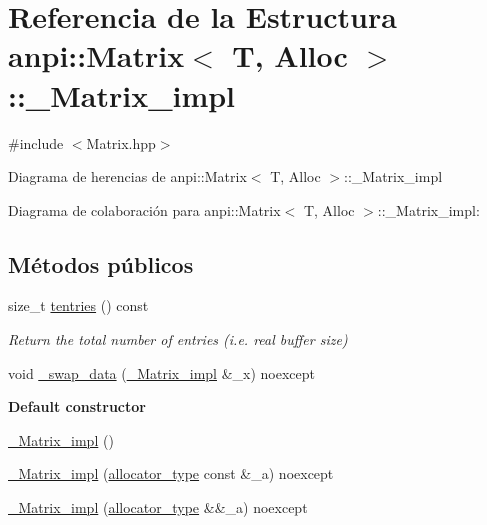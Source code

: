 \hypertarget{structanpi_1_1Matrix_1_1__Matrix__impl}{}\section{Referencia de la Estructura anpi\+:\+:Matrix$<$ T, Alloc $>$\+:\+:\+\_\+\+Matrix\+\_\+impl}
\label{structanpi_1_1Matrix_1_1__Matrix__impl}


{\ttfamily \#include $<$Matrix.\+hpp$>$}



Diagrama de herencias de anpi\+:\+:Matrix$<$ T, Alloc $>$\+:\+:\+\_\+\+Matrix\+\_\+impl


Diagrama de colaboración para anpi\+:\+:Matrix$<$ T, Alloc $>$\+:\+:\+\_\+\+Matrix\+\_\+impl\+:
\subsection*{Métodos públicos}
\begin{DoxyCompactItemize}
\item 
size\+\_\+t \hyperlink{structanpi_1_1Matrix_1_1__Matrix__impl_af9a5caaabb241f1acb9b275e3a0898ad}{tentries} () const
\begin{DoxyCompactList}\small\item\em Return the total number of entries (i.\+e. real buffer size) \end{DoxyCompactList}\item 
void \hyperlink{structanpi_1_1Matrix_1_1__Matrix__impl_ac7fa3cfa2d4ee9e2a1f9b77671169601}{\+\_\+swap\+\_\+data} (\hyperlink{structanpi_1_1Matrix_1_1__Matrix__impl}{\+\_\+\+Matrix\+\_\+impl} \&\+\_\+x) noexcept
\end{DoxyCompactItemize}
\begin{Indent}\textbf{ Default constructor}\par
\begin{DoxyCompactItemize}
\item 
\hyperlink{structanpi_1_1Matrix_1_1__Matrix__impl_a7ee30810c49444c8eb481d22c0a82274}{\+\_\+\+Matrix\+\_\+impl} ()
\item 
\hyperlink{structanpi_1_1Matrix_1_1__Matrix__impl_a1451d484426e27bf75cd914342f8cb20}{\+\_\+\+Matrix\+\_\+impl} (\hyperlink{classanpi_1_1Matrix_a3574b7528e3ddfb2f7cdf446be8286c1}{allocator\+\_\+type} const \&\+\_\+a) noexcept
\item 
\hyperlink{structanpi_1_1Matrix_1_1__Matrix__impl_a6d2a88ab7ffecd955a5d624f38e96752}{\+\_\+\+Matrix\+\_\+impl} (\hyperlink{classanpi_1_1Matrix_a3574b7528e3ddfb2f7cdf446be8286c1}{allocator\+\_\+type} \&\&\+\_\+a) noexcept
\end{DoxyCompactItemize}
\end{Indent}
